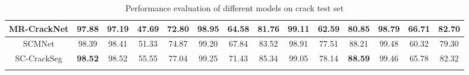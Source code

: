 \documentclass[a4paper,12pt]{report}
\begin{document}
\begin{table}[htbp]
\begin{adjustbox}{width=\columnwidth,center}
\begin{tabular}{|c|c|c|c|c|c|c|c|c|c|c|c|c|c|}
            \hline
            {MR-CrackNet\cite{nayyeri_multi-resolution_2021}} & {97.88}        & {97.19}                            & {47.69}                                 & {72.80}                                  & {98.95}                               & {64.58} & {81.76}        & {99.11} & {62.59} & {80.85}        & {98.79} & {66.71} & {82.70}        \\
            \hline
            {SCMNet\cite{singha_scmnet_2021}}                 & {98.39}        & {98.41}                            & {51.33}                                 & {74.87}                                  & {99.20}                               & {67.84} & {83.52}        & {98.91} & {77.51} & {88.21}        & {99.48} & {60.32} & {79.30}        \\
            \hline
            {SC-CrackSeg}                                     & \textbf{98.52} & {98.52}                            & {55.55}                                 & {77.04}                                  & {99.25}                               & {71.43} & {85.34}        & {99.05} & {78.14} & \textbf{88.59} & {99.46} & {65.78} & {82.32}        \\
            \hline
            \multicolumn{11}{l}{}
        \end{tabular}
    \end{adjustbox}
    \caption{Performance evaluation of different models on crack test set}%
\end{table}
\end{document}
